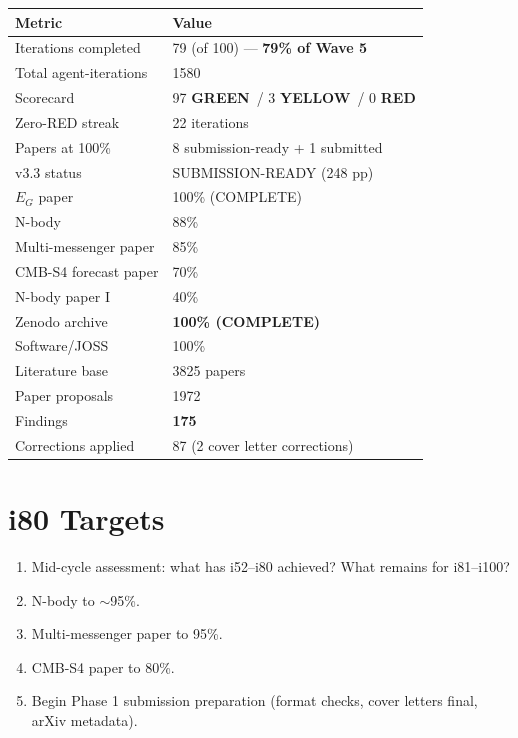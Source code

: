 \documentclass[11pt,a4paper]{article}
\newcommand{\GREEN}{\textcolor{dfdgreen}{\textbf{GREEN}}}
\newcommand{\YELLOW}{\textcolor{dfdyellow}{\textbf{YELLOW}}}
\newcommand{\RED}{\textcolor{dfdred}{\textbf{RED}}}
\begin{document}
\begin{center}
\begin{tabular}{ll}
\toprule
\textbf{Metric} & \textbf{Value} \\
\midrule
Iterations completed & 79 (of 100) --- \textbf{79\% of Wave 5} \\
Total agent-iterations & 1580 \\
Scorecard & 97 \GREEN\ / 3 \YELLOW\ / 0 \RED \\
Zero-RED streak & 22 iterations \\
Papers at 100\% & 8 submission-ready + 1 submitted \\
v3.3 status & SUBMISSION-READY (248 pp) \\
$E_G$ paper & 100\% (COMPLETE) \\
N-body & 88\% \\
Multi-messenger paper & 85\% \\
CMB-S4 forecast paper & 70\% \\
N-body paper I & 40\% \\
Zenodo archive & \textbf{100\% (COMPLETE)} \\
Software/JOSS & 100\% \\
Literature base & 3825 papers \\
Paper proposals & 1972 \\
Findings & \textbf{175} \\
Corrections applied & 87 (2 cover letter corrections) \\
\bottomrule
\end{tabular}
\end{center}

\section{i80 Targets}

\begin{enumerate}[nosep]
\item Mid-cycle assessment: what has i52--i80 achieved? What remains for i81--i100?
\item N-body to $\sim$95\%.
\item Multi-messenger paper to 95\%.
\item CMB-S4 paper to 80\%.
\item Begin Phase 1 submission preparation (format checks, cover letters final, arXiv metadata).
\end{enumerate}
\end{document}
